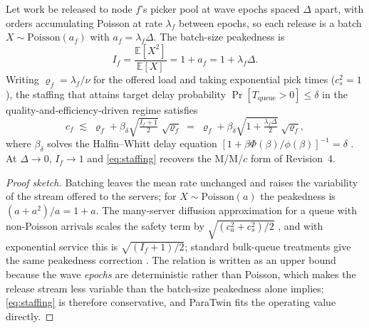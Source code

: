 \begin{proposition}\label{prop:staffing}
Let work be released to node $f$'s picker pool at wave epochs spaced $\Delta$ apart, with orders accumulating Poisson at rate $\lambda_f$ between epochs, so each release is a batch $X\sim\mathrm{Poisson}(a_f)$ with $a_f=\lambda_f\Delta$. The batch-size peakedness is
\begin{equation}\label{eq:dispersion}
I_f=\frac{\mathbb{E}[X^2]}{\mathbb{E}[X]}=1+a_f=1+\lambda_f\Delta .
\end{equation}
Writing $\varrho_f=\lambda_f/\nu$ for the offered load and taking exponential pick times ($c_s^2=1$), the staffing that attains target delay probability $\Pr[T_{\mathrm{queue}}>0]\le\delta$ in the quality-and-efficiency-driven regime satisfies
\begin{equation}\label{eq:staffing}
c_f \;\lesssim\; \varrho_f+\beta_\delta\sqrt{\tfrac{I_f+1}{2}}\;\sqrt{\varrho_f}
\;=\;\varrho_f+\beta_\delta\sqrt{1+\tfrac{\lambda_f\Delta}{2}}\;\sqrt{\varrho_f},
\end{equation}
where $\beta_\delta$ solves the Halfin--Whitt delay equation $[1+\beta\Phi(\beta)/\phi(\beta)]^{-1}=\delta$ \cite{halfin1981}. At $\Delta\to0$, $I_f\to1$ and \eqref{eq:staffing} recovers the M/M/$c$ form of Revision~4.
\end{proposition}
\begin{proof}[Proof sketch]
Batching leaves the mean rate unchanged and raises the variability of the stream offered to the servers; for $X\sim\mathrm{Poisson}(a)$ the peakedness is $(a+a^2)/a=1+a$. The many-server diffusion approximation for a queue with non-Poisson arrivals scales the safety term by $\sqrt{(c_a^2+c_s^2)/2}$ \cite{whitt1993,whitt2004}, and with exponential service this is $\sqrt{(I_f+1)/2}$; standard bulk-queue treatments give the same peakedness correction \cite{chaudhry1983}. The relation is written as an upper bound because the wave \emph{epochs} are deterministic rather than Poisson, which makes the release stream less variable than the batch-size peakedness alone implies; \eqref{eq:staffing} is therefore conservative, and ParaTwin fits the operating value directly.
\end{proof}

